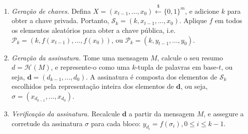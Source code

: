 \documentclass[12pt,notitlepage]{report}
\newcommand{\pk}{\mathcal{P}_k}
\newcommand{\sk}{\mathcal{S}_k}
\newcommand{\hash}[2][]{\mathcal{H}^{#1}(#2)}
\newcommand{\binwds}[1]{\{0, 1\}^{#1}}
\begin{document}
\begin{enumerate}

  \item[] \emph{Geração de chaves.} Defina $X = (x_{t - 1}, \dots, x_0)
      \stackrel{\$}{\longleftarrow} \binwds{m}$, e adicione $k$ para
      obter a chave privada. Portanto, $\sk{} = (k, x_{t - 1}, \dots, x_0)$.
      Aplique $f$ em todos os elementos aleatórios para obter a chave pública, i.e.
      $\pk{} = (k, f(x_{t - 1}), \dots, f(x_0))$, ou $\pk{} = (k, y_{t - 1}, \dots, y_0)$.

  \item[] \emph{Geração da assinatura.} Tome uma mensagem $M$, calcule o seu
    resumo $d = \hash{M}$, e represente-o como uma $k$-tupla de palavras em base-$t$,
    ou seja, $\mathbf{d} = (d_{k - 1}, \dots, d_0)$. A assinatura é composta dos elementos
    de $\sk{}$ escolhidos pela representação inteira dos elementos de $\mathbf{d}$,
    ou seja, $\sigma = (x_{d_{k - 1}}, \dots, x_{d_{0}})$.

  \item[] \emph{Verificação da assinatura.} Recalcule $\mathbf{d}$ a partir da mensagem $M$,
    e assegure a corretude da assinatura $\sigma$ para cada bloco: $y_{d_{i}} = f(\sigma_{i}), 0 \leq i \leq k - 1$.

\end{enumerate}
\end{document}
